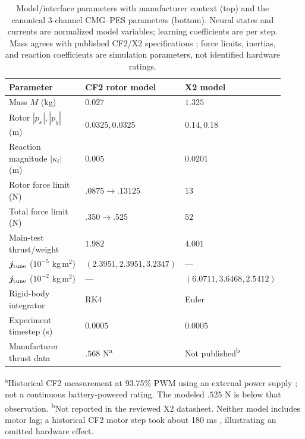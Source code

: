 \documentclass[letterpaper, 10 pt, conference]{ieeeconf}
\begin{document}
\begin{table}[t]
\centering
\caption{Model/interface parameters with manufacturer context (top) and the canonical 3-channel CMG--PES parameters (bottom). Neural states and currents are normalized model variables; learning coefficients are per step.
Mass agrees with published CF2/X2 specifications \cite{bitcrazeCF20Specs,skydioX2ESpecs}; force limits, inertias, and reaction coefficients are simulation parameters, not identified hardware ratings.}
\label{tab:models}\label{tab:parameters}
\setlength{\tabcolsep}{3pt}
\footnotesize
\begin{tabular}{@{}p{0.40\linewidth}p{0.27\linewidth}p{0.25\linewidth}@{}}
\toprule
Parameter & CF2 rotor model & X2 model\\
\midrule
Mass $M$ (kg) & $0.027$ & $1.325$\\
Rotor $|p_x|,|p_y|$ (m) & $0.0325,0.0325$ & $0.14,0.18$\\
Reaction magnitude $|\kappa_i|$ (m) & $0.005$ & $0.0201$\\
Rotor force limit (N) & $.0875\to.13125$ & $13$\\
Total force limit (N) & $.350\to.525$ & $52$\\
Main-test thrust/weight & $1.982$ & $4.001$\\
$\bm j_{\rm tune}$ ($10^{-5}$ kg\,m$^2$) & $(2.3951,\allowbreak2.3951,\allowbreak3.2347)$ & ---\\
$\bm j_{\rm tune}$ ($10^{-2}$ kg\,m$^2$) & --- & $(6.0711,\allowbreak3.6468,\allowbreak2.5412)$\\
Rigid-body integrator & RK4 & Euler\\
Experiment timestep (s) & $0.0005$ & $0.0005$\\
Manufacturer thrust data & $.568$ N\textsuperscript{a} & Not published\textsuperscript{b}\\
\bottomrule
\end{tabular}
\par\smallskip
\begin{minipage}{0.97\linewidth}
\scriptsize
\textsuperscript{a}Historical CF2 measurement at 93.75\% PWM using an external power supply \cite{bitcrazeThrustMeasurements}; not a continuous battery-powered rating. The modeled $.525$ N is below that observation.
\textsuperscript{b}Not reported in the reviewed X2 datasheet. Neither model includes motor lag; a historical CF2 motor step took about 180 ms \cite{bitcrazeMotorResponse}, illustrating an omitted hardware effect.
\end{minipage}
\par\medskip

\end{table}
\end{document}
